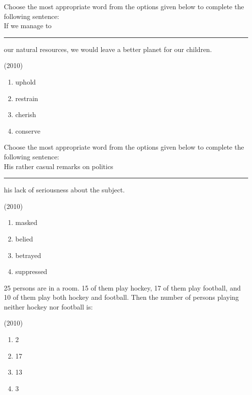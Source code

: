     \item Choose the most appropriate word from the options given below to complete the following sentence:\\
    If we manage to \rule{1cm}{0.15mm} our natural resources, we would leave a better planet for our children.
    
    \hfill{(2010)}

    \begin{multicols}{4}
        \begin{enumerate}
            \item uphold
            \item restrain
            \item cherish
            \item conserve
        \end{enumerate}
    \end{multicols}

    \item Choose the most appropriate word from the options given below to complete the following sentence:\\
    His rather casual remarks on politics \rule{1cm}{0.15mm} his lack of seriousness about the subject.
    
    \hfill{(2010)}

        \begin{multicols}{4}
            \begin{enumerate}
                \item masked
                \item belied
                \item betrayed
                \item suppressed
            \end{enumerate}
        \end{multicols}
		
    \item 25 persons are in a room. 15 of them play hockey, 17 of them play football, and 10 of them play both hockey and football. Then the number of persons playing neither hockey nor football is:
    
    \hfill{(2010)}

        \begin{multicols}{4}
            \begin{enumerate}
                \item 2
                \item 17
                \item 13
                \item 3
            \end{enumerate}
        \end{multicols}

